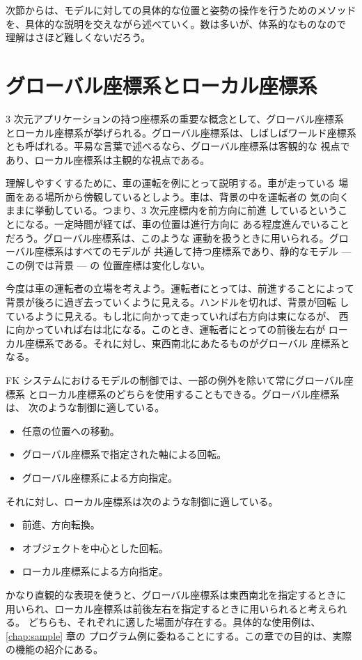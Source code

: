 次節からは、モデルに対しての具体的な位置と姿勢の操作を行うためのメソッド
を、具体的な説明を交えながら述べていく。数は多いが、体系的なものなので
理解はさほど難しくないだろう。
\section{グローバル座標系とローカル座標系}
3 次元アプリケーションの持つ座標系の重要な概念として、グローバル座標系
とローカル座標系が挙げられる。グローバル座標系は、しばしばワールド座標系
とも呼ばれる。平易な言葉で述べるなら、グローバル座標系は客観的な
視点であり、ローカル座標系は主観的な視点である。

理解しやすくするために、車の運転を例にとって説明する。車が走っている
場面をある場所から傍観しているとしよう。車は、背景の中を運転者の
気の向くままに挙動している。つまり、3 次元座標内を前方向に前進
しているということになる。一定時間が経てば、車の位置は進行方向に
ある程度進んでいることだろう。グローバル座標系は、このような
運動を扱うときに用いられる。グローバル座標系はすべてのモデルが
共通して持つ座標系であり、静的なモデル --- この例では背景 --- の
位置座標は変化しない。

今度は車の運転者の立場を考えよう。運転者にとっては、前進することによって
背景が後ろに過ぎ去っていくように見える。ハンドルを切れば、背景が回転
しているように見える。もし北に向かって走っていれば右方向は東になるが、
西に向かっていれば右は北になる。このとき、運転者にとっての前後左右が
ローカル座標系である。それに対し、東西南北にあたるものがグローバル
座標系となる。

FK システムにおけるモデルの制御では、一部の例外を除いて常にグローバル座標系
とローカル座標系のどちらを使用することもできる。グローバル座標系は、
次のような制御に適している。
\begin{itemize}
 \item 任意の位置への移動。
 \item グローバル座標系で指定された軸による回転。
 \item グローバル座標系による方向指定。
\end{itemize}
それに対し、ローカル座標系は次のような制御に適している。
\begin{itemize}
 \item 前進、方向転換。
 \item オブジェクトを中心とした回転。
 \item ローカル座標系による方向指定。
\end{itemize}
かなり直観的な表現を使うと、グローバル座標系は東西南北を指定するときに
用いられ、ローカル座標系は前後左右を指定するときに用いられると考えられる。
どちらも、それぞれに適した場面が存在する。具体的な使用例は、
\ref{chap:sample} 章の
プログラム例に委ねることにする。この章での目的は、実際の機能の紹介にある。


